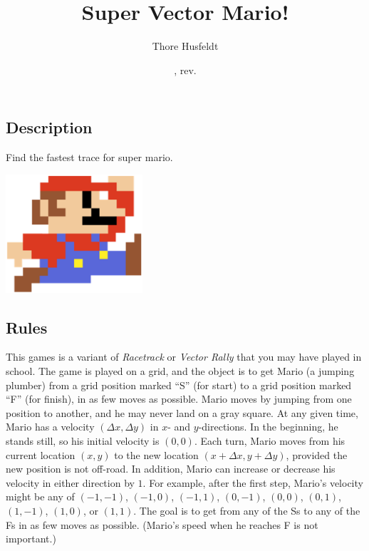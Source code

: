\documentclass{tufte-handout}
\title{Super Vector Mario!}
\author{Thore Husfeldt}
\date{\GITAuthorDate, rev. \GITAbrHash}
\begin{document}
\maketitle

\subsection{Description}
Find the fastest trace for super mario.

\begin{marginfigure}
\includegraphics[width = 2in]{mario.png}
\end{marginfigure}

\subsection{Rules}
This games is a variant of \emph{Racetrack} or \emph{Vector Rally} that you may have played in school.
The game is played on a grid, and the object is to get Mario (a jumping plumber) from a grid position marked ``S'' (for start) to a grid position marked ``F'' (for finish), in as few moves as possible.
Mario moves by jumping from one position to another, and he may never land on a gray square.
At any given time, Mario has a velocity $(\Delta x, \Delta y)$ in $x$- and $y$-directions.
In the beginning, he stands still, so his initial velocity is $(0,0)$.
Each turn, Mario moves from his current location $(x,y)$ to the new location $(x+\Delta x, y+\Delta y)$, provided the new position is not off-road.
In addition, Mario can increase or decrease his velocity in either direction by $1$.
For example, after the first step, Mario’s velocity might be any of $(-1,-1)$,  $(-1,0)$, $(-1,1)$, $(0,-1)$, $(0,0)$, $(0,1)$, $(1,-1)$, $(1,0)$, or $(1,1)$.
The goal is to get from any of the Ss to any of the Fs in as few moves as possible.
(Mario's speed when he reaches F is not important.)
\end{document}
